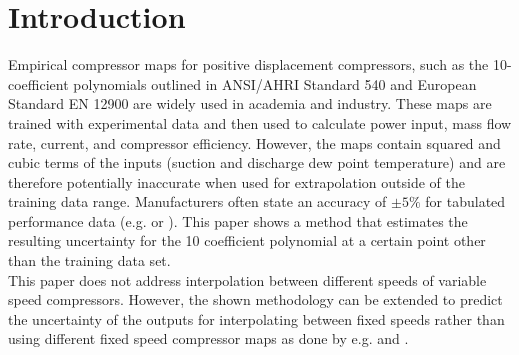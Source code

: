 \section{Introduction}
\label{sec:introduction}
Empirical compressor maps for positive displacement compressors, such as the 10-coefficient polynomials outlined in ANSI/AHRI Standard 540 \cite{AHRI:540} and European Standard EN 12900 \cite{CEN:2013}  are widely used in academia and industry.  These maps are trained with experimental data and then used to calculate power input, mass flow rate, current, and compressor efficiency.  However, the maps contain squared and cubic terms of the inputs (suction and discharge dew point temperature) and are therefore potentially inaccurate when used for extrapolation outside of the training data range. Manufacturers often state an accuracy of $\pm 5 \%$ for tabulated performance data (e.g. \cite{emerson:2006} or \cite{bristol:2015}). 
This paper shows a method that estimates the resulting uncertainty for the 10 coefficient polynomial at a certain point other than the training data set. \\
This paper does not address interpolation between different speeds of variable speed compressors. However, the shown methodology can be extended to predict the uncertainty of the outputs for interpolating between fixed speeds rather than using different fixed speed compressor maps as done by e.g.  \cite{shen:2014} and \cite{caskey:2012}.